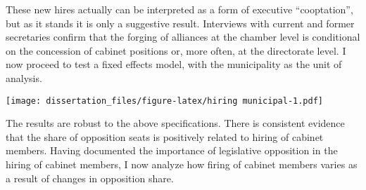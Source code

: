 \documentclass[12pt,]{book}
\newenvironment{Shaded}{\begin{snugshade}}{\end{snugshade}}
\newcommand{\CharTok}[1]{\textcolor[rgb]{0.31,0.60,0.02}{#1}}
\newcommand{\CommentTok}[1]{\textcolor[rgb]{0.56,0.35,0.01}{\textit{#1}}}
\newcommand{\DataTypeTok}[1]{\textcolor[rgb]{0.13,0.29,0.53}{#1}}
\newcommand{\KeywordTok}[1]{\textcolor[rgb]{0.13,0.29,0.53}{\textbf{#1}}}
\newcommand{\NormalTok}[1]{#1}
\newcommand{\OperatorTok}[1]{\textcolor[rgb]{0.81,0.36,0.00}{\textbf{#1}}}
\newcommand{\StringTok}[1]{\textcolor[rgb]{0.31,0.60,0.02}{#1}}
\begin{document}
These new hires actually can be interpreted as a form of executive ``cooptation'', but as it stands it is only a suggestive result. Interviews with current and former secretaries confirm that the forging of alliances at the chamber level is conditional on the concession of cabinet positions or, more often, at the directorate level. I now proceed to test a fixed effects model, with the municipality as the unit of analysis.

\begin{Shaded}
\end{Shaded}

\texttt{[image: dissertation\_files/figure-latex/hiring municipal-1.pdf]}

The results are robust to the above specifications. There is consistent evidence that the share of opposition seats is positively related to hiring of cabinet members. Having documented the importance of legislative opposition in the hiring of cabinet members, I now analyze how firing of cabinet members varies as a result of changes in opposition share.
\end{document}

